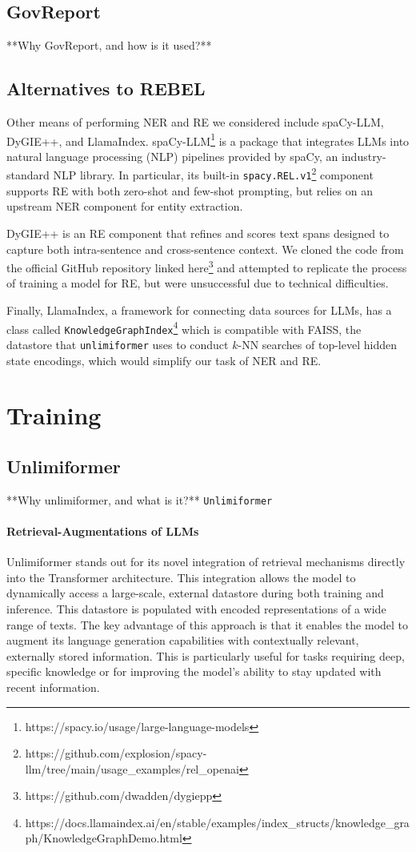\documentclass[12pt]{article}
\begin{document}
\subsection*{GovReport}
**Why GovReport, and how is it used?**


\subsection*{Alternatives to REBEL}

Other means of performing NER and RE we considered include spaCy-LLM, DyGIE++,
and LlamaIndex. spaCy-LLM\footnote{https://spacy.io/usage/large-language-models}
is a package that integrates LLMs into natural language processing (NLP) pipelines
provided by spaCy, an industry-standard NLP library.
In particular, its built-in
\texttt{spacy.REL.v1}\footnote{https://github.com/explosion/spacy-llm/tree/main/usage\_examples/rel\_openai}
component supports RE with both zero-shot and few-shot prompting, but relies on an upstream NER component for entity extraction. 

DyGIE++ is an RE component that refines and scores text spans designed to
capture both intra-sentence and cross-sentence context. We cloned the code from
the official GitHub repository linked
here\footnote{https://github.com/dwadden/dygiepp} and attempted to replicate
the process of training a model for RE, but were unsuccessful due to technical
difficulties. 

Finally, LlamaIndex, a framework for connecting data sources for LLMs, has a class called \texttt{KnowledgeGraphIndex}\footnote{https://docs.llamaindex.ai/en/stable/examples/index\_structs/knowledge\_graph/KnowledgeGraphDemo.html} which is compatible with FAISS, the datastore that \texttt{unlimiformer} uses to conduct $k$-NN searches of top-level hidden state encodings, which would simplify our task of NER and RE.

\section{Training}

\subsection*{Unlimiformer}
**Why unlimiformer, and what is it?**
\texttt{Unlimiformer} 

\paragraph{Retrieval-Augmentations of LLMs} Unlimiformer stands out for its novel
integration of retrieval mechanisms directly into the Transformer architecture.
This integration allows the model to dynamically access a large-scale, external
datastore during both training and inference. This datastore is populated with
encoded representations of a wide range of texts. The key advantage of this
approach is that it enables the model to augment its language generation
capabilities with contextually relevant, externally stored information. This is
particularly useful for tasks requiring deep, specific knowledge or for
improving the model's ability to stay updated with recent information.
\end{document}
